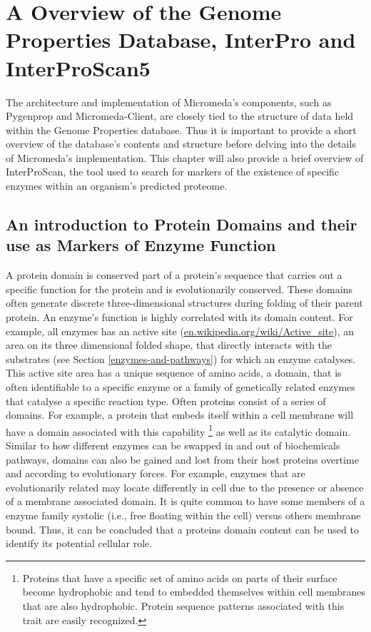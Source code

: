 \chapter{A Overview of the Genome Properties Database, InterPro and InterProScan5} \label{genome-properties-chapter} \label{genome-properties}

The architecture and implementation of Micromeda's components, such as Pygenprop and Micromeda-Client, are closely tied to the structure of data held within the Genome Properties database. Thus it is important to provide a short overview of the database's contents and structure before delving into the details of Micromeda's implementation. This chapter will also provide a brief overview of InterProScan, the tool used to search for markers of the existence of specific enzymes within an organism's predicted proteome.

\section{An introduction to Protein Domains and their use as Markers of Enzyme Function}

A protein domain is conserved part of a protein's sequence that carries out a specific function for the protein and is evolutionarily conserved. These domains often generate discrete three-dimensional structures during folding of their parent protein. An enzyme's function is highly correlated with its domain content. For example, all enzymes has an active site (\href{en.wikipedia.org/wiki/Active\_site}{en.wikipedia.org/wiki/Active\_site}), an area on its three dimensional folded shape, that directly interacts with the substrates (see Section \ref{enzymes-and-pathways}) for which an enzyme catalyses. This active site area has a unique sequence of amino acids, a domain, that is often identifiable to a specific enzyme or a family of genetically related enzymes that catalyse a specific reaction type. Often proteins consist of a series of domains. For example, a protein that embeds itself within a cell membrane will have a domain associated with this capability \footnote{Proteins that have a specific set of amino acids on parts of their surface become hydrophobic and tend to embedded themselves within cell membranes that are also hydrophobic. Protein sequence patterns associated with this trait are easily recognized.} as well as its catalytic domain. Similar to how different enzymes can be swapped in and out of biochemicals pathways, domains can also be gained and lost from their host proteins overtime and according to evolutionary forces. For example, enzymes that are evolutionarily related may locate differently in cell due to the presence or absence of a membrane associated domain. It is quite common to have some members of a enzyme family systolic (i.e., free floating within the cell) versus others membrane bound. Thus, it can be concluded that a proteins domain content can be used to identify its potential cellular role.

